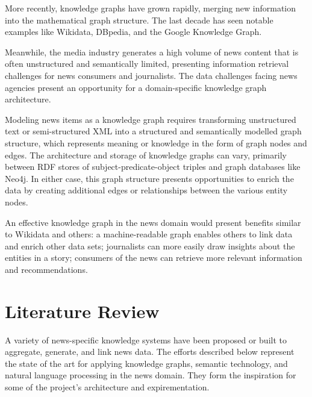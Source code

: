 \documentclass[11pt]{article}
\begin{document}
More recently, knowledge graphs have grown rapidly, merging new information into the mathematical graph structure. The last decade has seen notable examples like Wikidata, DBpedia, and the Google Knowledge Graph\cite{farber2015comparative}.

Meanwhile, the media industry generates a high volume of news content that is often unstructured and semantically limited, presenting information retrieval challenges for news consumers and journalists. The data challenges facing news agencies present an opportunity for a domain-specific knowledge graph architecture.

Modeling news items as a knowledge graph requires transforming unstructured text or semi-structured XML into a structured and semantically modelled graph structure, which represents meaning or knowledge in the form of graph nodes and edges. The architecture and storage of knowledge graphs can vary, primarily between RDF stores of subject-predicate-object triples and graph databases like Neo4j\cite{zhao2018architecture}. In either case, this graph structure presents opportunities to enrich the data by creating additional edges or relationships between the various entity nodes.

An effective knowledge graph in the news domain would present benefits similar to Wikidata and others: a machine-readable graph enables others to link data and enrich other data sets; journalists can more easily draw insights about the entities in a story; consumers of the news can retrieve more relevant information and recommendations.

\newpage
\section{Literature Review}
\label{sec:LiteratureReview}

A variety of news-specific knowledge systems have been proposed or built to aggregate, generate, and link news data. The efforts described below represent the state of the art for applying knowledge graphs, semantic technology, and natural language processing in the news domain. They form the inspiration for some of the project's architecture and expirementation.
\end{document}
